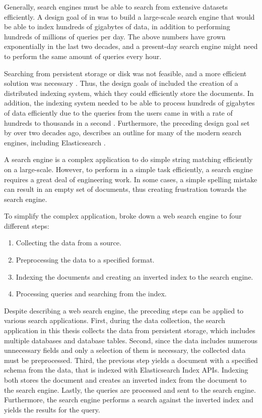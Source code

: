 Generally, search engines must be able to search from extensive datasets efficiently.
A design goal of \citeauthor{googleInit} \cite{googleInit} in \citeyear{googleInit}
was to build a large-scale search engine 
that would be able to index hundreds of gigabytes of data, in addition to
performing hundreds of millions of queries per day.
The above numbers have grown exponentially in the last two decades, and a present-day
search engine might need to perform the same amount of queries every hour.

Searching from persistent storage or disk was not feasible, and a more efficient 
solution was necessary \cite{googleInit}. 
Thus, the design goals of \citeauthor{googleInit} \cite{googleInit} included the creation of 
a distributed indexing system, 
which they could efficiently store the documents. 
In addition, the indexing system needed to be able to process hundreds of gigabytes of data efficiently 
due to the queries from the users came in with a rate of hundreds to thousands in 
a second \cite{googleInit}. 
Furthermore, the preceding design goal set by \citeauthor{googleInit} \cite{googleInit}
over two decades ago,
describes an outline for many of the modern search engines, 
including Elasticsearch \cite{relevantSearch}.

A search engine is a complex application to do simple string matching efficiently
on a large-scale.
However, to perform in a simple task efficiently, a search engine requires a great deal of 
engineering work.
In some cases, a simple spelling mistake can result in an empty set of documents, thus creating 
frustration towards the search engine.
\cite{relevantSearch}

To simplify the complex application,
\citeauthor{ganSuel} \cite{ganSuel} broke down a web search engine 
to four different steps:
\begin{enumerate}
    \item Collecting the data from a source.
    \item Preprocessing the data to a specified format.
    \item Indexing the documents and creating an inverted index to the search engine.
    \item Processing queries and searching from the index.
\end{enumerate}
Despite describing a web search engine, the preceding steps can be applied to various 
search applications. 
First, during the data collection, the search application in this thesis 
collects the data from persistent storage, which includes multiple databases and database tables.
Second, since the data includes numerous unnecessary fields 
and only a selection of them is necessary, the collected data must be preprocessed.
Third, the previous step yields a document with a specified schema from the data, 
that is indexed with Elasticsearch Index APIs.
Indexing both stores the document and creates an inverted index from the document to the search engine.
Lastly, the queries are processed and sent to the search engine. 
Furthermore, the search engine performs a search against the inverted index and yields the results for the query.



